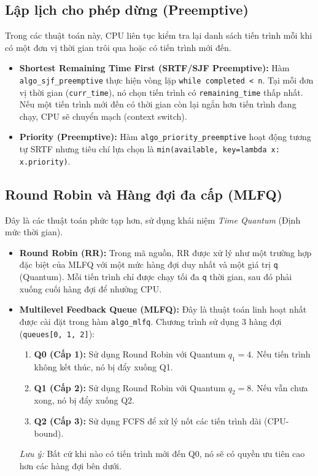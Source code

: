 \documentclass[12pt, letterpaper]{article}
\begin{document}
\subsection{Lập lịch cho phép dừng (Preemptive)}

Trong các thuật toán này, CPU liên tục kiểm tra lại danh sách tiến trình mỗi khi có một đơn vị thời gian trôi qua hoặc có tiến trình mới đến.

\begin{itemize}
    \item \textbf{Shortest Remaining Time First (SRTF/SJF Preemptive):} 
    Hàm \texttt{algo\_sjf\_preemptive} thực hiện vòng lặp \texttt{while completed < n}. Tại mỗi đơn vị thời gian (\texttt{curr\_time}), nó chọn tiến trình có \texttt{remaining\_time} thấp nhất. Nếu một tiến trình mới đến có thời gian còn lại ngắn hơn tiến trình đang chạy, CPU sẽ chuyển mạch (context switch).
    
    \item \textbf{Priority (Preemptive):} 
    Hàm \texttt{algo\_priority\_preemptive} hoạt động tương tự SRTF nhưng tiêu chí lựa chọn là \texttt{min(available, key=lambda x: x.priority)}.
\end{itemize}



\subsection{Round Robin và Hàng đợi đa cấp (MLFQ)}

Đây là các thuật toán phức tạp hơn, sử dụng khái niệm \textit{Time Quantum} (Định mức thời gian).

\begin{itemize}
    \item \textbf{Round Robin (RR):} 
    Trong mã nguồn, RR được xử lý như một trường hợp đặc biệt của MLFQ với một mức hàng đợi duy nhất và một giá trị \texttt{q} (Quantum). Mỗi tiến trình chỉ được chạy tối đa \texttt{q} thời gian, sau đó phải xuống cuối hàng đợi để nhường CPU.
    
    \item \textbf{Multilevel Feedback Queue (MLFQ):} 
    Đây là thuật toán linh hoạt nhất được cài đặt trong hàm \texttt{algo\_mlfq}. Chương trình sử dụng 3 hàng đợi (\texttt{queues[0, 1, 2]}):
    \begin{enumerate}
        \item \textbf{Q0 (Cấp 1):} Sử dụng Round Robin với Quantum $q_1=4$. Nếu tiến trình không kết thúc, nó bị đẩy xuống Q1.
        \item \textbf{Q1 (Cấp 2):} Sử dụng Round Robin với Quantum $q_2=8$. Nếu vẫn chưa xong, nó bị đẩy xuống Q2.
        \item \textbf{Q2 (Cấp 3):} Sử dụng FCFS để xử lý nốt các tiến trình dài (CPU-bound).
    \end{enumerate}
    \textit{Lưu ý:} Bất cứ khi nào có tiến trình mới đến Q0, nó sẽ có quyền ưu tiên cao hơn các hàng đợi bên dưới.
\end{itemize}
\end{document}
